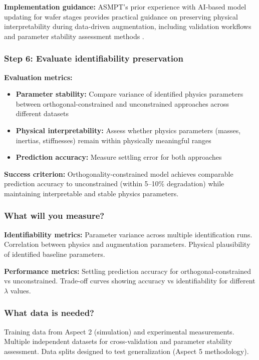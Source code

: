 \textbf{Implementation guidance:}
ASMPT's prior experience with AI-based model updating for wafer stages provides practical guidance on preserving physical interpretability during data-driven augmentation, including validation workflows and parameter stability assessment methods \citep{kessels2025}.

\subsubsection{Step 6: Evaluate identifiability preservation}

\textbf{Evaluation metrics:}
\begin{itemize}
    \item \textbf{Parameter stability:} Compare variance of identified physics parameters between orthogonal-constrained and unconstrained approaches across different datasets
    \item \textbf{Physical interpretability:} Assess whether physics parameters (masses, inertias, stiffnesses) remain within physically meaningful ranges
    \item \textbf{Prediction accuracy:} Measure settling error for both approaches
\end{itemize}

\textbf{Success criterion:}
Orthogonality-constrained model achieves comparable prediction accuracy to unconstrained (within 5--10\% degradation) while maintaining interpretable and stable physics parameters.

\subsubsection{What will you measure?}

\textbf{Identifiability metrics:}
Parameter variance across multiple identification runs. Correlation between physics and augmentation parameters. Physical plausibility of identified baseline parameters.

\textbf{Performance metrics:}
Settling prediction accuracy for orthogonal-constrained vs unconstrained. Trade-off curves showing accuracy vs identifiability for different $\lambda$ values.

\subsubsection{What data is needed?}

Training data from Aspect 2 (simulation) and experimental measurements. Multiple independent datasets for cross-validation and parameter stability assessment. Data splits designed to test generalization (Aspect 5 methodology).

